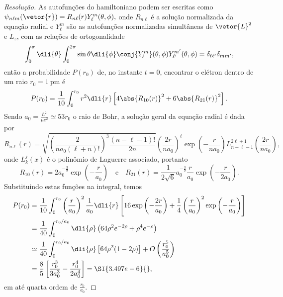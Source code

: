 \begin{proof}[Resolução]
    As autofunções do hamiltoniano podem ser escritas como \(\psi_{n \ell m}(\vetor{r}) = R_{n \ell}(r) Y_{\ell}^m(\theta,\phi),\) onde \(R_{n \ell}\) é a solução normalizada da equação radial e \(Y_\ell^m\) são as autofunções normalizadas simultâneas de \(\vetor{L}^2\) e \(L_z\), com as relações de ortogonalidade
    \begin{equation*}
        \int_0^\pi \dli{\theta}\int_0^{2\pi}\sin\theta\dli{\phi} \conj{Y_{\ell}^m}(\theta,\phi)Y_{\ell'}^{m'}(\theta,\phi) = \delta_{\ell \ell'} \delta_{m m'},
    \end{equation*}
    então a probabilidade \(P(r_0)\) de, no instante \(t=0\), encontrar o elétron dentro de um raio \(r_0 = \SI{1}{\pico\meter}\) é
    \begin{equation*}
        P(r_0)=\frac{1}{10} \int_0^{r_0} r^2 \dli{r}  \left[4\abs{R_{10}(r)}^2 + 6\abs{R_{21}(r)}^2\right].
    \end{equation*}
    Sendo \(a_0 = \frac{\hbar^2}{\mu e^2}\simeq 53 r_0\) o raio de Bohr, a solução geral da equação radial é dada por
    \begin{equation*}
        R_{n\ell}(r) = \sqrt{\left(\frac{2}{n a_0 (\ell + n)!}\right)^3\frac{(n - \ell -1)!}{2n}}  \left(\frac{2r}{n a_0}\right)^\ell \exp\left(-\frac{r}{na_0}\right) L^{2\ell + 1}_{n - \ell - 1}\left(\frac{2r}{n a_0}\right),
    \end{equation*}
    onde \(L_k^j(x)\) é o polinômio de Laguerre associado, portanto
    \begin{equation*}
        R_{10}(r) = 2a_0^{-\frac32} \exp\left(-\frac{r}{a_0}\right)
        \quad\text{e}\quad
        R_{21}(r) = \frac{1}{2\sqrt{6}}a_0^{-\frac32} \frac{r}{a_0} \exp\left(-\frac{r}{2a_0}\right).
    \end{equation*}
    Substituindo estas funções na integral, temos
    \begin{align*}
        P(r_0) &= \frac{1}{10} \int_0^{r_0} \left(\frac{r}{a_0}\right)^2 \frac{1}{a_0} \dli{r} \left[16 \exp\left(-\frac{2r}{a_0}\right) + \frac14 \left(\frac{r}{a_0}\right)^2\exp\left(-\frac{r}{a_0}\right)\right]\\
               &= \frac{1}{40} \int_0^{r_0/a_0} \dli{\rho} \left(64 \rho^2 e^{-2\rho} + \rho^4 e^{-\rho}\right)\\
               &\simeq \frac{1}{40} \int_0^{r_0/a_0} \dli{\rho} \left[64 \rho^2(1 - 2\rho)\right] + O\left(\frac{r_0^5}{a_0^5}\right)\\
               &= \frac{8}{5}\left[\frac{r_0^3}{3a_0^3} - \frac{r_0^4}{2a_0^4}\right] = \SI{3.497e-6}{},
    \end{align*}
    em até quarta ordem de \(\frac{r_0}{a_0}\).


\end{proof}
